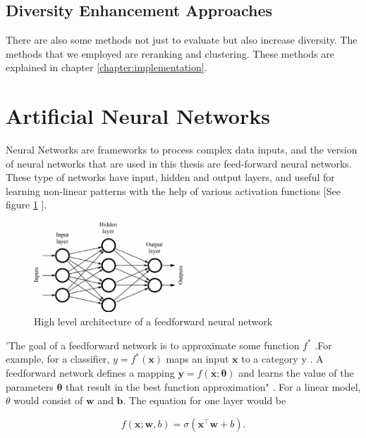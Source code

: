 \subsection{Diversity Enhancement Approaches}

There are also some methods not just to evaluate but also increase diversity. The methods that we employed are reranking and clustering. These methods are explained in chapter \ref{chapter:implementation}.

\section{Artificial Neural Networks}\label{research:nn}

Neural Networks are frameworks to process complex data inputs, and the version of neural networks that are used in this thesis are feed-forward neural networks. These type of networks have input, hidden and output layers, and useful for learning non-linear patterns with the help of various activation functions [See figure \ref{fig:ffnn} ].

\begin{figure}[htp]
	\centering
	\includegraphics[width=0.5\textwidth]{figures/FFNN.png}
	\caption{High level architecture of a feedforward neural network ~\parencite{nnimagesource}}
	\label{fig:ffnn}
\end{figure}


'The goal of a feedforward network is to approximate some function $f^{*}$ .For example, for a classifier,  $y=f^{*}(\boldsymbol{x})$ maps an input  $\boldsymbol{x}$ to a category y .  A feedforward network  defines a mapping $\boldsymbol{y}=f(\boldsymbol{x} ; \boldsymbol{\theta})$ and learns the value of the parameters $\boldsymbol{\theta}$  that result in the best function approximation" \cite{Goodfellow-et-al-2016}. For a linear model, $\theta$ would consist of $\boldsymbol{w}$ and $\boldsymbol{b}$. The equation for one layer would be

\begin{equation}
f(\boldsymbol{x} ; \boldsymbol{w}, b)=\sigma(\boldsymbol{x}^{\top} \boldsymbol{w}+b) .
\label{eq:nn-one-layer}
\end{equation} 

